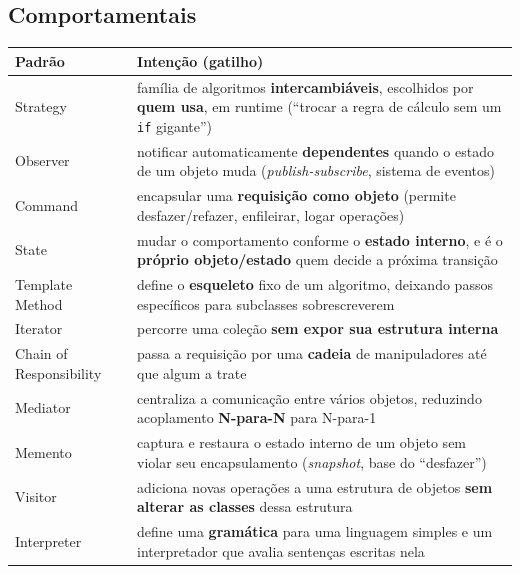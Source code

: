 \subsection{Comportamentais}

\begin{conceito}
\begin{center}
\begin{tabular}{@{}p{2.8cm}p{9cm}@{}}
\toprule
\textbf{Padrão} & \textbf{Intenção (gatilho)} \\
\midrule
Strategy & família de algoritmos \textbf{intercambiáveis}, escolhidos por
\textbf{quem usa}, em runtime (“trocar a regra de cálculo sem um
\texttt{if} gigante”) \\
Observer & notificar automaticamente \textbf{dependentes} quando o estado
de um objeto muda (\textit{publish-subscribe}, sistema de eventos) \\
Command & encapsular uma \textbf{requisição como objeto} (permite
desfazer/refazer, enfileirar, logar operações) \\
State & mudar o comportamento conforme o \textbf{estado interno}, e é o
\textbf{próprio objeto/estado} quem decide a próxima transição \\
Template Method & define o \textbf{esqueleto} fixo de um algoritmo,
deixando passos específicos para subclasses sobrescreverem \\
Iterator & percorre uma coleção \textbf{sem expor sua estrutura interna} \\
Chain of Responsibility & passa a requisição por uma \textbf{cadeia} de
manipuladores até que algum a trate \\
Mediator & centraliza a comunicação entre vários objetos, reduzindo
acoplamento \textbf{N-para-N} para N-para-1 \\
Memento & captura e restaura o estado interno de um objeto sem violar seu
encapsulamento (\textit{snapshot}, base do “desfazer”) \\
Visitor & adiciona novas operações a uma estrutura de objetos \textbf{sem
alterar as classes} dessa estrutura \\
Interpreter & define uma \textbf{gramática} para uma linguagem simples e um
interpretador que avalia sentenças escritas nela \\
\bottomrule
\end{tabular}
\end{center}
\end{conceito}

